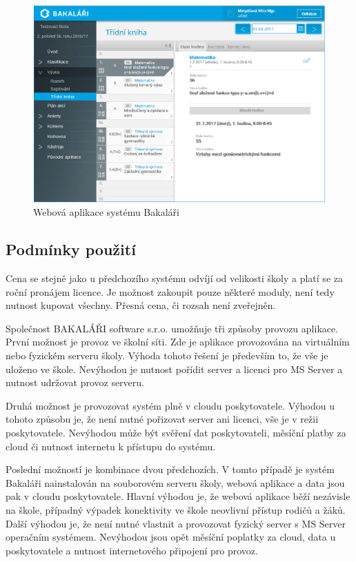 \begin{figure}[h]
	\centering
	\includegraphics[width=\textwidth]{images/bakalari2.png}
	\caption{Webová aplikace systému Bakaláři}
	\label{bakalari2}
\end{figure}


\subsection{Podmínky použití}
Cena se stejně jako u předchozího systému odvíjí od velikosti školy a platí se za roční pronájem licence. Je možnost zakoupit pouze některé moduly, není tedy nutnost kupovat všechny. Přesná cena, či rozsah není zveřejněn.

Společnost BAKALÁŘI software s.r.o. umožňuje tři způsoby provozu aplikace. 
První možnost je provoz ve školní síti. Zde je aplikace provozována na virtuálním nebo fyzickém serveru školy. Výhoda tohoto řešení je především to, že vše je uloženo ve škole. Nevýhodou je nutnost pořídit server a licenci pro MS Server a nutnost udržovat provoz serveru. \cite{bakalari_nasazeni}

Druhá možnost je provozovat systém plně v cloudu poskytovatele. Výhodou u tohoto způsobu je, že není nutné pořizovat server ani licenci, vše je v režii poskytovatele. Nevýhodou může být svěření dat poskytovateli, měsíční platby za cloud či nutnost internetu k přístupu do systému. \cite{bakalari_nasazeni}

Poslední možností je kombinace dvou předchozích. V tomto případě je systém Bakaláři nainstalován na souborovém serveru školy, webová aplikace a data jsou pak v cloudu poskytovatele. Hlavní výhodou je, že webová aplikace běží nezávisle na škole, případný výpadek konektivity ve škole neovlivní přístup rodičů a žáků. Další výhodou je, že není nutné vlastnit a provozovat fyzický server s MS Server operačním systémem. Nevýhodou jsou opět měsíční poplatky za cloud, data u poskytovatele a nutnost internetového připojení pro provoz. \cite{bakalari_nasazeni}

